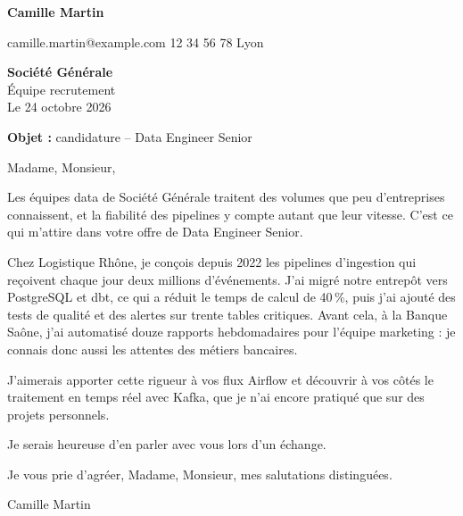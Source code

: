 \documentclass[11pt, a4paper]{article}
\makeatletter
\newcommand{\candidat}{Camille Martin}
\newcommand{\coordonnees}{camille.martin@example.com \quad 06 12 34 56 78 \quad Lyon}
\newcommand{\entreprise}{Société Générale}
\newcommand{\destinataire}{Équipe recrutement}
\newcommand{\poste}{Data Engineer Senior}
\newcommand{\datelettre}{Le 24 octobre 2026}
\makeatother
\begin{document}
{\Large\bfseries\color{bleuencre}\candidat}\par\vspace{-0.6em}
{\small\color{midgray}\coordonnees}

\vspace{1.2em}
\begin{flushright}
  \textbf{\entreprise}\\
  \destinataire\\[0.8em]
  \datelettre
\end{flushright}

\textbf{Objet :} candidature -- \poste

Madame, Monsieur,

Les équipes data de Société Générale traitent des volumes que peu d'entreprises connaissent, et la fiabilité des pipelines y compte autant que leur vitesse. C'est ce qui m'attire dans votre offre de Data Engineer Senior.

Chez Logistique Rhône, je conçois depuis 2022 les pipelines d'ingestion qui reçoivent chaque jour deux millions d'événements. J'ai migré notre entrepôt vers PostgreSQL et dbt, ce qui a réduit le temps de calcul de 40\,\%, puis j'ai ajouté des tests de qualité et des alertes sur trente tables critiques. Avant cela, à la Banque Saône, j'ai automatisé douze rapports hebdomadaires pour l'équipe marketing : je connais donc aussi les attentes des métiers bancaires.

J'aimerais apporter cette rigueur à vos flux Airflow et découvrir à vos côtés le traitement en temps réel avec Kafka, que je n'ai encore pratiqué que sur des projets personnels.

Je serais heureuse d'en parler avec vous lors d'un échange.

Je vous prie d'agréer, Madame, Monsieur, mes salutations distinguées.

\vspace{0.6em}
\candidat
\end{document}
